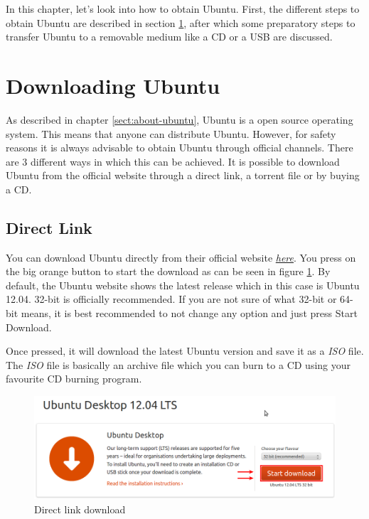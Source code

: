 In this chapter, let's look into how to obtain Ubuntu. First, the different steps to obtain Ubuntu are described in section \ref{sect:obtain_ubuntu}, after which some preparatory steps to transfer Ubuntu to a removable medium like a CD or a USB are discussed.

\section{Downloading Ubuntu} \label{sect:obtain_ubuntu} 
As described in chapter \ref{sect:about-ubuntu}, Ubuntu is a open source operating system. This means that anyone can distribute Ubuntu. However, for safety reasons it is always advisable to obtain Ubuntu through official channels. There are 3 different ways in which this can be achieved. It is possible to download Ubuntu from the official website through a direct link, a torrent file or by buying a CD.

\subsection*{Direct Link} \label{sect:obtain_ubuntu_direct} 
You can download Ubuntu directly from their official website \href{http://www.ubuntu.com/download/ubuntu/download}{\textit{here}}. You press on the big orange button to start the download as can be seen in figure \ref{fig:direct-link}. By default, the Ubuntu website shows the latest release which in this case is Ubuntu 12.04. 32-bit is officially recommended. If you are not sure of what 32-bit or 64-bit means, it is best recommended to not change any option and just press Start Download.\\ 

\par \noindent Once pressed, it will download the latest Ubuntu version and save it as a \emph{ISO} file. The \emph{ISO} file is basically an archive file which you can burn to a CD using your favourite CD burning program. 

\begin{figure}[h]	
	\begin{center}
	\includegraphics[width=400pt]{./images/obtain-ubuntu/direct-link.png}
	\caption{Direct link download}	
	\label{fig:direct-link}	
	\end{center}
\end{figure}


